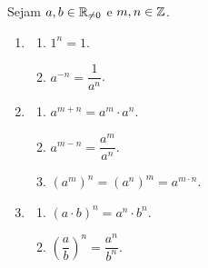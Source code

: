 \begin{corollary}
    Sejam $a,b \in \mathbb{R}_{\neq 0}$ e $m,n \in \mathbb{Z}$.
        \begin{enumerate}[leftmargin=*, align=left, label=\textbf{(\alph*)}]
            \item
                \begin{enumerate}[label=\roman*.]
                    \item $1^n = 1$.
                    \item $a^{-n} = \dfrac{1}{a^n}$.
                \end{enumerate}
            \item
                \begin{enumerate}[label=\roman*.]
                    \item $a^{m+n} = a^m \cdot a^n$.
                    \item $a^{m-n} = \dfrac{a^m}{a^n}$.
                    \item $(a^m)^n = (a^n)^m = a^{m \cdot n}$.
                \end{enumerate}
            \item
                \begin{enumerate}[label=\roman*.]
                    \item $(a \cdot b)^n = a^n \cdot b^n$.
                    \item $\left(\dfrac{a}{b}\right)^n = \dfrac{a^n}{b^n}$.
                \end{enumerate}
        \end{enumerate}
\end{corollary}

